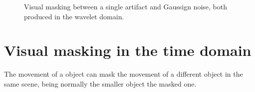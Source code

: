 \begin{figure}
  \caption{Visual masking between a single artifact and Gaussign
    noise, both produced in the wavelet
    domain.~\cite{taubman2012jpeg2000}}
  \label{fig:visual_masking}
\end{figure}

\section{Visual masking in the time domain}
The movement of a object can mask the movement of a different object
in the same scene, being normally the smaller object the masked one.


